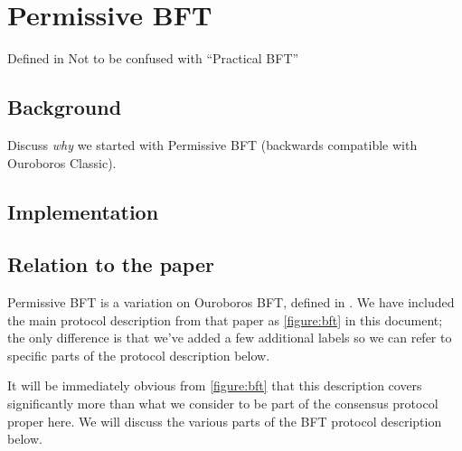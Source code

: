 \section{Permissive BFT}
\label{bft}

Defined in \cite{byron-chain-spec}
Not to be confused with ``Practical BFT'' \cite{10.1145/571637.571640}

\subsection{Background}
\label{bft:background}

\duncan
Discuss \emph{why} we started with Permissive BFT (backwards compatible with
Ouroboros Classic).

\subsection{Implementation}

\subsection{Relation to the paper}
\label{bft-paper}

Permissive BFT is a variation on Ouroboros BFT, defined in
\cite{cryptoeprint:2018:1049}. We have included the main protocol description
from that paper as \cref{figure:bft} in this document; the only difference is
that we've added a few additional labels so we can refer to specific parts of
the protocol description below.

It will be immediately obvious from \cref{figure:bft} that this description
covers significantly more than what we consider to be part of the consensus
protocol proper here. We will discuss the various parts of the BFT protocol
description below.

